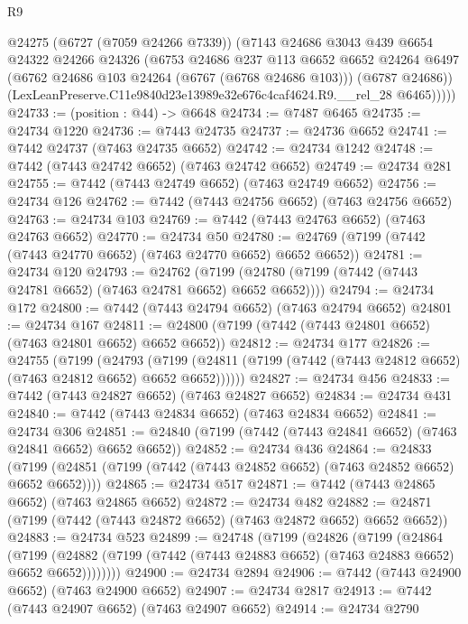 \begin{lexlean}{R9}
\begin{coremodule}
          @24275
          (@6727 (@7059 @24266 @7339))
          (@7143
            @24686
            @3043
            @439
            @6654
            @24322
            @24266
            @24326
            (@6753
              @24686
              @237
              @113
              @6652
              @6652
              @24264
              @6497
              (@6762 @24686 @103 @24264 (@6767 (@6768 @24686 @103)))
              (@6787 @24686))
            (LexLeanPreserve.C11e9840d23e13989e32e676c4caf4624.R9.__rel_28 @6465)))))
@24733 := (position : @44) -> @6648
@24734 := @7487 @6465
@24735 := @24734 @1220
@24736 := @7443 @24735
@24737 := @24736 @6652
@24741 := @7442 @24737 (@7463 @24735 @6652)
@24742 := @24734 @1242
@24748 := @7442 (@7443 @24742 @6652) (@7463 @24742 @6652)
@24749 := @24734 @281
@24755 := @7442 (@7443 @24749 @6652) (@7463 @24749 @6652)
@24756 := @24734 @126
@24762 := @7442 (@7443 @24756 @6652) (@7463 @24756 @6652)
@24763 := @24734 @103
@24769 := @7442 (@7443 @24763 @6652) (@7463 @24763 @6652)
@24770 := @24734 @50
@24780 := @24769 (@7199 (@7442 (@7443 @24770 @6652) (@7463 @24770 @6652) @6652 @6652))
@24781 := @24734 @120
@24793 := @24762
    (@7199 (@24780 (@7199 (@7442 (@7443 @24781 @6652) (@7463 @24781 @6652) @6652 @6652))))
@24794 := @24734 @172
@24800 := @7442 (@7443 @24794 @6652) (@7463 @24794 @6652)
@24801 := @24734 @167
@24811 := @24800 (@7199 (@7442 (@7443 @24801 @6652) (@7463 @24801 @6652) @6652 @6652))
@24812 := @24734 @177
@24826 := @24755
    (@7199
      (@24793
        (@7199 (@24811 (@7199 (@7442 (@7443 @24812 @6652) (@7463 @24812 @6652) @6652 @6652))))))
@24827 := @24734 @456
@24833 := @7442 (@7443 @24827 @6652) (@7463 @24827 @6652)
@24834 := @24734 @431
@24840 := @7442 (@7443 @24834 @6652) (@7463 @24834 @6652)
@24841 := @24734 @306
@24851 := @24840 (@7199 (@7442 (@7443 @24841 @6652) (@7463 @24841 @6652) @6652 @6652))
@24852 := @24734 @436
@24864 := @24833
    (@7199 (@24851 (@7199 (@7442 (@7443 @24852 @6652) (@7463 @24852 @6652) @6652 @6652))))
@24865 := @24734 @517
@24871 := @7442 (@7443 @24865 @6652) (@7463 @24865 @6652)
@24872 := @24734 @482
@24882 := @24871 (@7199 (@7442 (@7443 @24872 @6652) (@7463 @24872 @6652) @6652 @6652))
@24883 := @24734 @523
@24899 := @24748
    (@7199
      (@24826
        (@7199
          (@24864
            (@7199
              (@24882 (@7199 (@7442 (@7443 @24883 @6652) (@7463 @24883 @6652) @6652 @6652))))))))
@24900 := @24734 @2894
@24906 := @7442 (@7443 @24900 @6652) (@7463 @24900 @6652)
@24907 := @24734 @2817
@24913 := @7442 (@7443 @24907 @6652) (@7463 @24907 @6652)
@24914 := @24734 @2790

\end{coremodule}
\end{lexlean}
